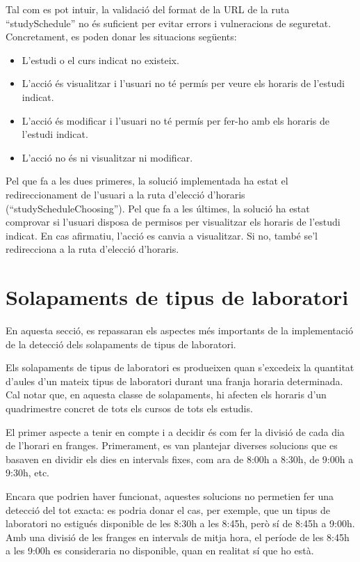 \documentclass[a4paper,12pt]{ThesisStyle}
\begin{document}
Tal com es pot intuir, la validació del format de la URL de la ruta ``studySchedule'' no és suficient per evitar errors i vulneracions de seguretat. Concretament, es poden donar les situacions següents:
\begin{itemize}
  \item L'estudi o el curs indicat no existeix.
  \item L'acció és visualitzar i l'usuari no té permís per veure els horaris de l'estudi indicat.
  \item L'acció és modificar i l'usuari no té permís per fer-ho amb els horaris de l'estudi indicat.
  \item L'acció no és ni visualitzar ni modificar.
\end{itemize}

Pel que fa a les dues primeres, la solució implementada ha estat el redireccionament de l'usuari a la ruta d'elecció d'horaris (``studyScheduleChoosing''). Pel que fa a les últimes, la solució ha estat comprovar si l'usuari disposa de permisos per visualitzar els horaris de l'estudi indicat. En cas afirmatiu, l'acció es canvia a visualitzar. Si no, també se'l redirecciona a la ruta d'elecció d'horaris.

\section{Solapaments de tipus de laboratori}
\label{sec:solapaments_lab}

En aquesta secció, es repassaran els aspectes més importants de la implementació de la detecció dels solapaments de tipus de laboratori.

Els solapaments de tipus de laboratori es produeixen quan s'excedeix la quantitat d'aules d'un mateix tipus de laboratori durant una franja horaria determinada. Cal notar que, en aquesta classe de solapaments, hi afecten els horaris d'un quadrimestre concret de tots els cursos de tots els estudis.

El primer aspecte a tenir en compte i a decidir és com fer la divisió de cada dia de l'horari en franges. Primerament, es van plantejar diverses solucions que es basaven en dividir els dies en intervals fixes, com ara de 8:00h a 8:30h, de 9:00h a 9:30h, etc.

Encara que podrien haver funcionat, aquestes solucions no permetien fer una detecció del tot exacta: es podria donar el cas, per exemple, que un tipus de laboratori no estigués disponible de les 8:30h a les 8:45h, però sí de 8:45h a 9:00h. Amb una divisió de les franges en intervals de mitja hora, el període de les 8:45h a les 9:00h es consideraria no disponible, quan en realitat sí que ho està.
\end{document}
